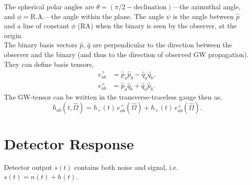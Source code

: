 \documentclass[10pt, oneside, onecolumn]{article}   	%
\begin{document}
        The spherical polar angles are $\theta = (\pi/2 - \mathrm{declination})$---the azimuthal angle, and $\phi = \mathrm{R.A.}$---the angle within the plane.  The angle $\psi$ is the angle between $\hat{p}$ and a line of constant $\phi$ (RA) when the binary is seen by the observer, at the origin. \\

        The binary basis vectors $\hat{p}$, $\hat{q}$ are perpendicular to the direction between the observer and the binary (and thus to the direction of observed GW propagation).  They can define basis tensors,
        \begin{align}
        e^{+}_{ab} & = \hat{p}_a \hat{p}_b - \hat{q}_a \hat{q}_b, \nonumber \\
        e^{\times}_{ab} & = \hat{p}_a \hat{q}_b + \hat{q}_a \hat{p}_b.
        \end{align}
        The GW-tensor can be written in the transverse-traceless gauge then as,
        \begin{equation}
        h_{ab}(t, \hat{\Omega}) = h_{+}(t) \, e^{+}_{ab}(\hat{\Omega}) + h_{\times}(t) \, e^{\times}_{ab}(\hat{\Omega}).
        \end{equation}


    \section{Detector Response}
        \label{sec:det_resp}
        Detector output $s(t)$ contains both noise and signal, i.e.~$s(t) = n(t) + h(t)$.

\end{document}
